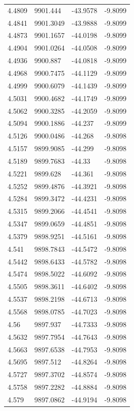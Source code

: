 \begin{table}[H]
\begin{tabular}{llll}
4.4809 & 9901.444 & -43.9578 & -9.8099 \\
4.4841 & 9901.3049 & -43.9888 & -9.8099 \\
4.4873 & 9901.1657 & -44.0198 & -9.8099 \\
4.4904 & 9901.0264 & -44.0508 & -9.8099 \\
4.4936 & 9900.887 & -44.0818 & -9.8099 \\
4.4968 & 9900.7475 & -44.1129 & -9.8099 \\
4.4999 & 9900.6079 & -44.1439 & -9.8099 \\
4.5031 & 9900.4682 & -44.1749 & -9.8099 \\
4.5062 & 9900.3285 & -44.2059 & -9.8099 \\
4.5094 & 9900.1886 & -44.237 & -9.8099 \\
4.5126 & 9900.0486 & -44.268 & -9.8098 \\
4.5157 & 9899.9085 & -44.299 & -9.8098 \\
4.5189 & 9899.7683 & -44.33 & -9.8098 \\
4.5221 & 9899.628 & -44.361 & -9.8098 \\
4.5252 & 9899.4876 & -44.3921 & -9.8098 \\
4.5284 & 9899.3472 & -44.4231 & -9.8098 \\
4.5315 & 9899.2066 & -44.4541 & -9.8098 \\
4.5347 & 9899.0659 & -44.4851 & -9.8098 \\
4.5379 & 9898.9251 & -44.5161 & -9.8098 \\
4.541 & 9898.7843 & -44.5472 & -9.8098 \\
4.5442 & 9898.6433 & -44.5782 & -9.8098 \\
4.5474 & 9898.5022 & -44.6092 & -9.8098 \\
4.5505 & 9898.3611 & -44.6402 & -9.8098 \\
4.5537 & 9898.2198 & -44.6713 & -9.8098 \\
4.5568 & 9898.0785 & -44.7023 & -9.8098 \\
4.56 & 9897.937 & -44.7333 & -9.8098 \\
4.5632 & 9897.7954 & -44.7643 & -9.8098 \\
4.5663 & 9897.6538 & -44.7953 & -9.8098 \\
4.5695 & 9897.512 & -44.8264 & -9.8098 \\
4.5727 & 9897.3702 & -44.8574 & -9.8098 \\
4.5758 & 9897.2282 & -44.8884 & -9.8098 \\
4.579 & 9897.0862 & -44.9194 & -9.8098 \\

\end{tabular}
\end{table}
